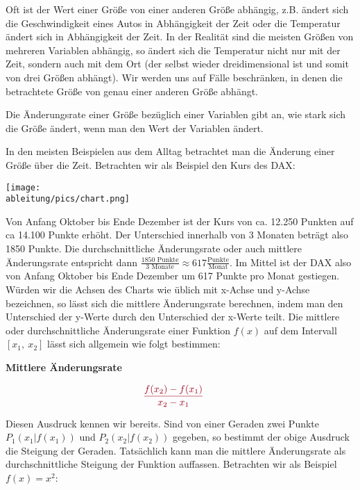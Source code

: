 Oft ist der Wert einer Größe von einer anderen Größe abhängig, z.B. ändert sich die Geschwindigkeit eines Autos in Abhängigkeit der Zeit oder die Temperatur ändert sich in Abhängigkeit der Zeit. In der Realität sind die meisten Größen von mehreren Variablen abhängig, so ändert sich die Temperatur nicht nur mit der Zeit, sondern auch mit dem Ort (der selbst wieder dreidimensional ist und somit von drei Größen abhängt). Wir werden uns auf Fälle beschränken, in denen die betrachtete Größe von genau einer anderen Größe abhängt.
\begin{tcolorbox}
	\textcolor{loestc}{Die Änderungsrate einer Größe bezüglich einer Variablen gibt an, wie stark sich die Größe ändert, wenn man den Wert der Variablen ändert.}

    \bigskip

\end{tcolorbox}
In den meisten Beispielen aus dem Alltag betrachtet man die Änderung einer Größe über die Zeit. Betrachten wir als Beispiel den Kurs des DAX:

\begin{minipage}[t]{\textwidth}
	\centering\texttt{[image: \\ableitung/pics/chart.png]}
\end{minipage}

Von Anfang Oktober bis Ende Dezember ist der Kurs von ca. 12.250 Punkten auf ca 14.100 Punkte erhöht. Der Unterschied innerhalb von 3 Monaten beträgt also 1850 Punkte. Die durchschnittliche Änderungsrate oder auch mittlere Änderungsrate entspricht dann \(\frac{1850\text{ Punkte}}{3\text{ Monate}}\approx 617\frac{\text{Punkte}}{\text{Monat}}\). Im Mittel ist der DAX also von Anfang Oktober bis Ende Dezember um 617 Punkte pro Monat gestiegen. Würden wir die Achsen des Charts wie üblich mit x-Achse und y-Achse bezeichnen, so lässt sich die mittlere Änderungsrate berechnen, indem man den Unterschied der y-Werte durch den Unterschied der x-Werte teilt.\newpage
Die mittlere oder durchschnittliche Änderungsrate einer Funktion \(f(x)\) auf dem Intervall \([x_1,\ x_2]\) lässt sich allgemein wie folgt bestimmen:
\begin{tcolorbox}
	\textbf{Mittlere Änderungsrate}

	\Large$\makebox[\linewidth]{\textcolor{loestc}{\(\dfrac{f(x_2)-f(x_1)}{x_2-x_1}\)}}$
\end{tcolorbox}
Diesen Ausdruck kennen wir bereits. Sind von einer Geraden zwei Punkte \(P_1(x_1\vert f(x_1))\) und \(P_2(x_2\vert f(x_2))\) gegeben, so bestimmt der obige Ausdruck die Steigung der Geraden. Tatsächlich kann man die mittlere Änderungsrate als durchschnittliche Steigung der Funktion auffassen. Betrachten wir als Beispiel \(f(x)=x^2\):

